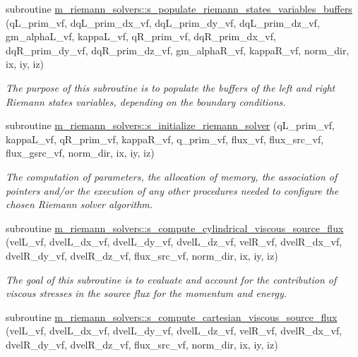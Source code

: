\begin{DoxyCompactItemize}
subroutine \hyperlink{namespacem__riemann__solvers_ae82ad8216dcc6938b86cf0bd5c17467b}{m\+\_\+riemann\+\_\+solvers\+::s\+\_\+populate\+\_\+riemann\+\_\+states\+\_\+variables\+\_\+buffers} (q\+L\+\_\+prim\+\_\+vf, dq\+L\+\_\+prim\+\_\+dx\+\_\+vf, dq\+L\+\_\+prim\+\_\+dy\+\_\+vf, dq\+L\+\_\+prim\+\_\+dz\+\_\+vf, gm\+\_\+alpha\+L\+\_\+vf, kappa\+L\+\_\+vf, q\+R\+\_\+prim\+\_\+vf, dq\+R\+\_\+prim\+\_\+dx\+\_\+vf, dq\+R\+\_\+prim\+\_\+dy\+\_\+vf, dq\+R\+\_\+prim\+\_\+dz\+\_\+vf, gm\+\_\+alpha\+R\+\_\+vf, kappa\+R\+\_\+vf, norm\+\_\+dir, ix, iy, iz)
\begin{DoxyCompactList}\small\item\em The purpose of this subroutine is to populate the buffers of the left and right Riemann states variables, depending on the boundary conditions. \end{DoxyCompactList}\item 
subroutine \hyperlink{namespacem__riemann__solvers_a86766279fcf7527f2b148adff4666b1c}{m\+\_\+riemann\+\_\+solvers\+::s\+\_\+initialize\+\_\+riemann\+\_\+solver} (q\+L\+\_\+prim\+\_\+vf, kappa\+L\+\_\+vf, q\+R\+\_\+prim\+\_\+vf, kappa\+R\+\_\+vf, q\+\_\+prim\+\_\+vf, flux\+\_\+vf, flux\+\_\+src\+\_\+vf, flux\+\_\+gsrc\+\_\+vf, norm\+\_\+dir, ix, iy, iz)
\begin{DoxyCompactList}\small\item\em The computation of parameters, the allocation of memory, the association of pointers and/or the execution of any other procedures needed to configure the chosen Riemann solver algorithm. \end{DoxyCompactList}\item 
subroutine \hyperlink{namespacem__riemann__solvers_a50ff087624d23846c62cd711dd003757}{m\+\_\+riemann\+\_\+solvers\+::s\+\_\+compute\+\_\+cylindrical\+\_\+viscous\+\_\+source\+\_\+flux} (vel\+L\+\_\+vf, dvel\+L\+\_\+dx\+\_\+vf, dvel\+L\+\_\+dy\+\_\+vf, dvel\+L\+\_\+dz\+\_\+vf, vel\+R\+\_\+vf, dvel\+R\+\_\+dx\+\_\+vf, dvel\+R\+\_\+dy\+\_\+vf, dvel\+R\+\_\+dz\+\_\+vf, flux\+\_\+src\+\_\+vf, norm\+\_\+dir, ix, iy, iz)
\begin{DoxyCompactList}\small\item\em The goal of this subroutine is to evaluate and account for the contribution of viscous stresses in the source flux for the momentum and energy. \end{DoxyCompactList}\item 
subroutine \hyperlink{namespacem__riemann__solvers_a58c0a2ab06eb5094f60c5e68dbde7300}{m\+\_\+riemann\+\_\+solvers\+::s\+\_\+compute\+\_\+cartesian\+\_\+viscous\+\_\+source\+\_\+flux} (vel\+L\+\_\+vf, dvel\+L\+\_\+dx\+\_\+vf, dvel\+L\+\_\+dy\+\_\+vf, dvel\+L\+\_\+dz\+\_\+vf, vel\+R\+\_\+vf, dvel\+R\+\_\+dx\+\_\+vf, dvel\+R\+\_\+dy\+\_\+vf, dvel\+R\+\_\+dz\+\_\+vf, flux\+\_\+src\+\_\+vf, norm\+\_\+dir, ix, iy, iz)

\end{DoxyCompactItemize}
